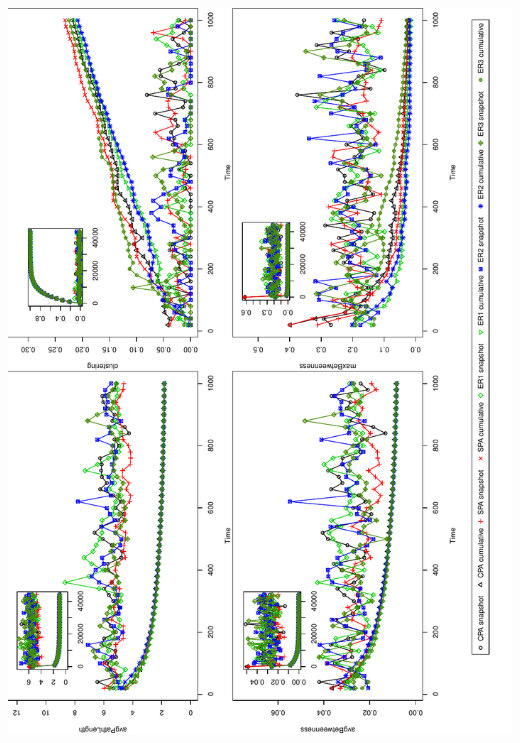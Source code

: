 \documentclass[a0paper,portrait]{baposter}
\begin{document}
\begin{poster}
{\includegraphics[angle=-90,width=0.98\linewidth]{PA_and_ER_Models_statisticalMeasures}
}

\end{poster}
\end{document}
